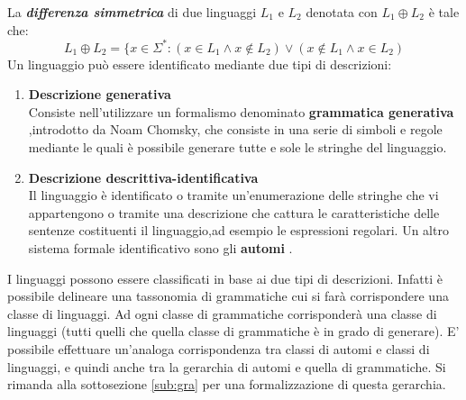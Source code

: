  La \textbf{\textit{differenza simmetrica}} di due linguaggi $L_1 \text{ e } L_2$ denotata con $L_1 \oplus L_2$ è tale che:
 \begin{equation*}
 L_1 \oplus L_2 = \{x \in \Sigma^{*} : (x \in L_1 \land x \notin  L_2) \lor (x \notin L_1 \land x \in L_2)
 \end{equation*}
 Un linguaggio può essere identificato mediante due tipi di descrizioni:
 \begin{enumerate}
 \item \textbf{Descrizione generativa}\\Consiste nell'utilizzare un formalismo denominato \textbf{grammatica generativa} ,introdotto da Noam Chomsky, che consiste in una serie di simboli e regole mediante le quali è possibile generare tutte e sole le stringhe del linguaggio.
 \item \textbf{Descrizione descrittiva-identificativa}\\Il linguaggio è identificato o tramite un'enumerazione delle stringhe che vi appartengono o tramite una descrizione che cattura le caratteristiche delle sentenze costituenti il linguaggio,ad esempio le espressioni regolari. Un altro sistema formale identificativo sono gli \textbf{automi} .
 \end{enumerate}
 I linguaggi possono essere classificati in base ai due tipi di descrizioni.  Infatti è possibile delineare una tassonomia di grammatiche cui si farà corrispondere una classe di linguaggi. Ad ogni classe di grammatiche corrisponderà una classe di linguaggi (tutti quelli che quella classe di grammatiche è in grado di generare). 
E' possibile effettuare un'analoga corrispondenza tra classi di automi e classi di linguaggi, e quindi anche tra la gerarchia di automi e quella di grammatiche. Si rimanda alla sottosezione \ref{sub:gra} per una formalizzazione di questa gerarchia. 
 
 
